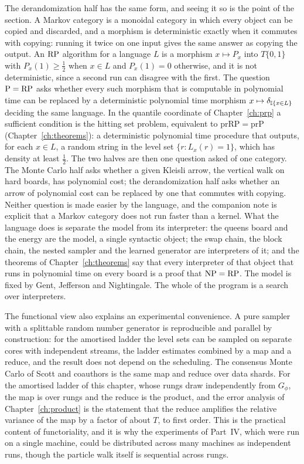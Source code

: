 The derandomization half has the same form, and seeing it so is the point of the section. A Markov category \cite{Fritz} is a monoidal category in which every object can be copied and discarded, and a morphism is deterministic exactly when it commutes with copying: running it twice on one input gives the same answer as copying the output. An $\mathrm{RP}$ algorithm for a language $L$ is a morphism $x \mapsto P_x$ into $T\{0, 1\}$ with $P_x(1) \ge \tfrac12$ when $x \in L$ and $P_x(1) = 0$ otherwise, and it is not deterministic, since a second run can disagree with the first. The question $\mathrm{P} = \mathrm{RP}$ asks whether every such morphism that is computable in polynomial time can be replaced by a deterministic polynomial time morphism $x \mapsto \delta_{\mathbb{I}\{x \in L\}}$ deciding the same language. In the quantile coordinate of Chapter~\ref{ch:prp} a sufficient condition is the hitting set problem, equivalent to $\mathrm{prRP} = \mathrm{prP}$ (Chapter~\ref{ch:theorems}): a deterministic polynomial time procedure that outputs, for each $x \in L$, a random string in the level set $\{ r : L_x(r) = 1 \}$, which has density at least $\tfrac12$. The two halves are then one question asked of one category. The Monte Carlo half asks whether a given Kleisli arrow, the vertical walk on hard boards, has polynomial cost; the derandomization half asks whether an arrow of polynomial cost can be replaced by one that commutes with copying. Neither question is made easier by the language, and the companion note is explicit that a Markov category does not run faster than a kernel. What the language does is separate the model from its interpreter: the queens board and the energy are the model, a single syntactic object; the swap chain, the block chain, the nested sampler and the learned generator are interpreters of it; and the theorems of Chapter~\ref{ch:theorems} say that every interpreter of that object that runs in polynomial time on every board is a proof that $\mathrm{NP} = \mathrm{RP}$. The model is fixed by Gent, Jefferson and Nightingale. The whole of the program is a search over interpreters.

The functional view also explains an experimental convenience. A pure sampler with a splittable random number generator is reproducible and parallel by construction: for the amortised ladder the level sets can be sampled on separate cores with independent streams, the ladder estimates combined by a map and a reduce, and the result does not depend on the scheduling. The consensus Monte Carlo of Scott and coauthors \cite{ScottConsensus} is the same map and reduce over data shards. For the amortised ladder of this chapter, whose rungs draw independently from $G_\phi$, the map is over rungs and the reduce is the product, and the error analysis of Chapter~\ref{ch:product} is the statement that the reduce amplifies the relative variance of the map by a factor of about $T$, to first order. This is the practical content of functoriality, and it is why the experiments of Part~IV, which were run on a single machine, could be distributed across many machines as independent runs, though the particle walk itself is sequential across rungs.
